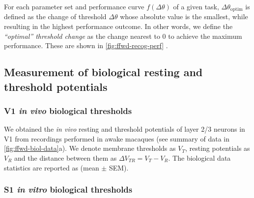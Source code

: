 For each parameter set and performance curve $f(\Delta \theta)$ of a given task,
    $\Delta \theta_{\text{optim}}$ is defined as the change of threshold $\Delta \theta$
        whose absolute value is the smallest,
        while resulting in the highest performance outcome.
    In other words, we define the \textit{``optimal'' threshold change}
        as the change nearest to 0 to achieve the maximum performance.
    These are shown in \autoref{fig:ffwd-recog-perf}
        .

\subsection{Measurement of biological resting and threshold potentials}

\subsubsection*{V1 \textit{in vivo} biological thresholds}

We obtained the \textit{in vivo} resting and threshold potentials
        of layer 2/3 neurons in V1 from recordings performed in awake macaques \citep{Li2020-ej}
        (see summary of data in \autoref{fig:ffwd-biol-data}a).
    We denote membrane thresholds as $V_T$,
        resting potentials as $V_R$
        and the distance between them as $\Delta V_{TR} = V_T - V_R$.
    The biological data statistics are reported as (mean $\pm$ SEM).

\subsubsection*{S1 \textit{in vitro} biological thresholds}

